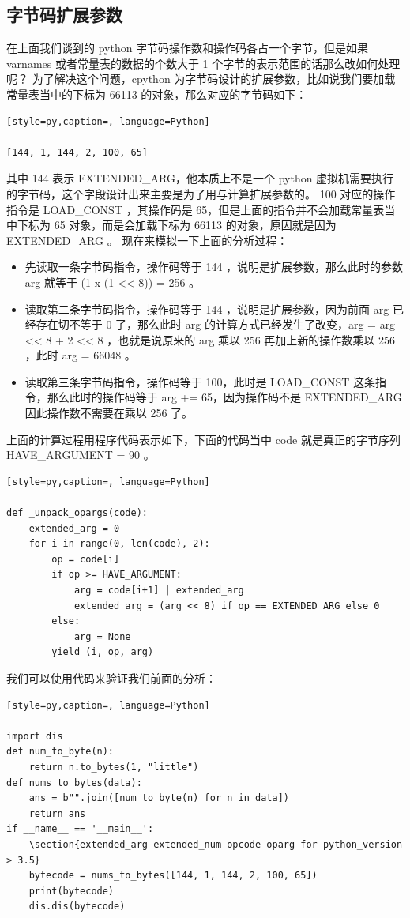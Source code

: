 \subsection{字节码扩展参数}
在上面我们谈到的 python 字节码操作数和操作码各占一个字节，但是如果 varnames 或者常量表的数据的个数大于 1 个字节的表示范围的话那么改如何处理呢？
为了解决这个问题，cpython 为字节码设计的扩展参数，比如说我们要加载常量表当中的下标为 66113 的对象，那么对应的字节码如下：
\begin{lstlisting}[style=py,caption=, language=Python]

[144, 1, 144, 2, 100, 65]
\end{lstlisting}
其中 144 表示 EXTENDED\_ARG，他本质上不是一个 python 虚拟机需要执行的字节码，这个字段设计出来主要是为了用与计算扩展参数的。
100 对应的操作指令是 LOAD\_CONST ，其操作码是 65，但是上面的指令并不会加载常量表当中下标为 65 对象，而是会加载下标为 66113 的对象，原因就是因为  EXTENDED\_ARG 。
现在来模拟一下上面的分析过程：
\begin{itemize}
\item 先读取一条字节码指令，操作码等于 144 ，说明是扩展参数，那么此时的参数 arg 就等于 (1 x (1 << 8)) = 256 。
\item 读取第二条字节码指令，操作码等于 144 ，说明是扩展参数，因为前面 arg 已经存在切不等于 0 了，那么此时 arg 的计算方式已经发生了改变，arg = arg << 8 + 2 << 8 ，也就是说原来的 arg 乘以 256 再加上新的操作数乘以 256 ，此时 arg = 66048 。
\item 读取第三条字节码指令，操作码等于 100，此时是 LOAD\_CONST 这条指令，那么此时的操作码等于 arg += 65，因为操作码不是 EXTENDED\_ARG 因此操作数不需要在乘以 256 了。
\end{itemize}
上面的计算过程用程序代码表示如下，下面的代码当中 code 就是真正的字节序列 HAVE\_ARGUMENT = 90 。
\begin{lstlisting}[style=py,caption=, language=Python]

def _unpack_opargs(code):
    extended_arg = 0
    for i in range(0, len(code), 2):
        op = code[i]
        if op >= HAVE_ARGUMENT:
            arg = code[i+1] | extended_arg
            extended_arg = (arg << 8) if op == EXTENDED_ARG else 0
        else:
            arg = None
        yield (i, op, arg)
\end{lstlisting}
我们可以使用代码来验证我们前面的分析：
\begin{lstlisting}[style=py,caption=, language=Python]

import dis
def num_to_byte(n):
    return n.to_bytes(1, "little")
def nums_to_bytes(data):
    ans = b"".join([num_to_byte(n) for n in data])
    return ans
if __name__ == '__main__':
    \section{extended_arg extended_num opcode oparg for python_version > 3.5}
    bytecode = nums_to_bytes([144, 1, 144, 2, 100, 65])
    print(bytecode)
    dis.dis(bytecode)
\end{lstlisting}
